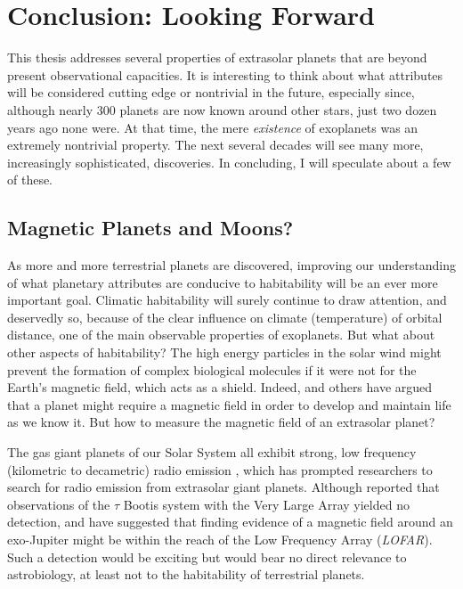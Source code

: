 \chapter[Conclusion: Looking Forward]{Conclusion: Looking Forward}
\label{ch:conc}
\markright{}


This thesis addresses several properties of extrasolar planets that
are beyond present observational capacities.  It is interesting to
think about what attributes will be considered cutting edge or
nontrivial in the future, especially since, although nearly 300
planets are now known around other stars, just two dozen years ago
none were.  At that time, the mere {\it existence} of exoplanets was
an extremely nontrivial property.  The next several decades will see
many more, increasingly sophisticated, discoveries.  In concluding, I
will speculate about a few of these.


\section{Magnetic Planets and Moons?}
\label{conc_sec:mag}

As more and more terrestrial planets are discovered, improving our
understanding of what planetary attributes are conducive to
habitability will be an ever more important goal.  Climatic
habitability will surely continue to draw attention, and deservedly
so, because of the clear influence on climate (temperature) of orbital
distance, one of the main observable properties of exoplanets.  But
what about other aspects of habitability?  The high energy particles
in the solar wind might prevent the formation of complex biological
molecules if it were not for the Earth's magnetic field, which acts as
a shield.  Indeed, \citet{dehant_et_al2007} and others have argued
that a planet might require a magnetic field in order to develop and
maintain life as we know it.  But how to measure the magnetic field of
an extrasolar planet?

The gas giant planets of our Solar System all exhibit strong, low
frequency (kilometric to decametric) radio emission \citep{zarka1992},
which has prompted researchers to search for radio emission from
extrasolar giant planets.  Although \citet{lazio+farrell2007} reported
that observations of the $\tau$ Bootis system with the Very Large
Array yielded no detection, \citet{farrell_et_al2004} and
\citet{griebmeier_et_al2005} have suggested that finding evidence of a
magnetic field around an exo-Jupiter might be within the reach of the
Low Frequency Array ({\it LOFAR}).  Such a detection would be exciting
but would bear no direct relevance to astrobiology, at least not to
the habitability of terrestrial planets.

